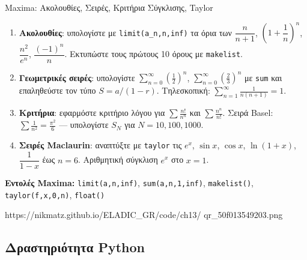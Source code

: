 %

\casactivbox%
  {Maxima: Ακολουθίες, Σειρές, Κριτήρια Σύγκλισης, Taylor}%
  {%
    \label{cas:ch13_sequences_series}
    \begin{enumerate}[label=(\alph*),itemsep=2pt]
      \item \textbf{Ακολουθίες}: υπολογίστε με \texttt{limit(a\_n,n,inf)}
        τα όρια των $\dfrac{n}{n+1}$, $\left(1+\dfrac{1}{n}\right)^n$,
        $\dfrac{n^2}{e^n}$, $\dfrac{(-1)^n}{n}$.
        Εκτυπώστε τους πρώτους 10 όρους με \texttt{makelist}.
      \item \textbf{Γεωμετρικές σειρές}: υπολογίστε
        $\sum_{n=0}^{\infty}\!\left(\tfrac{1}{2}\right)^n$,
        $\sum_{n=0}^{\infty}\!\left(\tfrac{2}{3}\right)^n$
        με \texttt{sum} και επαληθεύστε τον τύπο $S=a/(1-r)$.
        Τηλεσκοπική: $\sum_{n=1}^{\infty}\frac{1}{n(n+1)}=1$.
      \item \textbf{Κριτήρια}: εφαρμόστε κριτήριο λόγου
        για $\sum \frac{n!}{n^n}$ και $\sum \frac{n^n}{n!}$.
        Σειρά Basel: $\sum\frac{1}{n^2}=\frac{\pi^2}{6}$ —
        υπολογίστε $S_N$ για $N=10,100,1000$.
      \item \textbf{Σειρές Maclaurin}: αναπτύξτε με \texttt{taylor}
        τις $e^x$, $\sin x$, $\cos x$, $\ln(1+x)$, $\dfrac{1}{1-x}$
        έως $n=6$. Αριθμητική σύγκλιση $e^x$ στο $x=1$.
    \end{enumerate}
    \smallskip
    \textbf{Εντολές Maxima:}
    \texttt{limit(a,n,inf)}, \texttt{sum(a,n,1,inf)},
    \texttt{makelist()}, \texttt{taylor(f,x,0,n)},
    \texttt{float()}
  }%
  {https://nikmatz.github.io/ELADIC_GR/code/ch13/}%
  {qr_50f013549203.png}

\subsection*{Δραστηριότητα Python}

